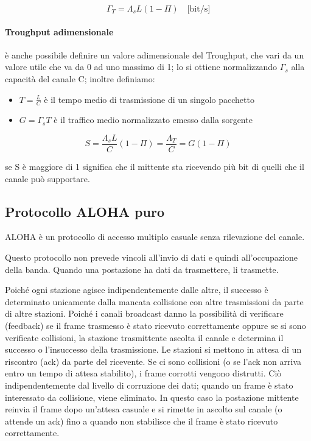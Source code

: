 \begin{equation}
    \Gamma_T = \Lambda_s L (1 - \Pi) \quad \text{[bit/s]}
\end{equation}
\paragraph{Troughput adimensionale}
è anche possibile definire un valore adimensionale del Troughput, che vari da un valore utile che va da 0 ad uno massimo di 1; lo si ottiene normalizzando $\Gamma_s$ alla capacità del canale C; inoltre definiamo:
\begin{itemize}
    \item $T = \frac{L}{C}$ è il tempo medio di trasmissione di un singolo pacchetto
    \item $G = \Gamma_sT$ è il traffico medio normalizzato emesso dalla sorgente
\end{itemize}


\begin{equation}
    S = \frac{\Lambda_s L}{C}(1 - \Pi) = \frac{\Lambda_T}{C} = G(1 - \Pi)
\end{equation}

se S è maggiore di 1 significa che il mittente sta ricevendo più bit di quelli che il canale può supportare.

\newpage

\subsection{Protocollo ALOHA puro}
ALOHA è un protocollo di accesso multiplo casuale senza rilevazione del canale.

Questo protocollo non prevede vincoli all'invio di dati e quindi all'occupazione della banda. Quando una postazione ha dati da trasmettere, li trasmette.

Poiché ogni stazione agisce indipendentemente dalle altre, il successo è determinato unicamente dalla mancata collisione con altre trasmissioni da parte di altre stazioni. Poiché i canali broadcast danno la possibilità di verificare (feedback) se il frame trasmesso è stato ricevuto correttamente oppure se si sono verificate collisioni, la stazione trasmittente ascolta il canale e determina il successo o l'insuccesso della trasmissione. Le stazioni si mettono in attesa di un riscontro (ack) da parte del ricevente. Se ci sono collisioni (o se l'ack non arriva entro un tempo di attesa stabilito), i frame corrotti vengono distrutti. Ciò indipendentemente dal livello di corruzione dei dati; quando un frame è stato interessato da collisione, viene eliminato. In questo caso la postazione mittente reinvia il frame dopo un'attesa casuale e si rimette in ascolto sul canale (o attende un ack) fino a quando non stabilisce che il frame è stato ricevuto correttamente.
